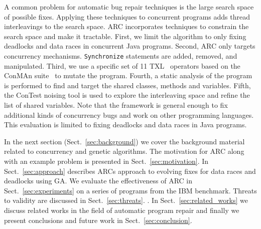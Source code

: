 A common problem for automatic bug repair techniques is the large search space of possible fixes. Applying these techniques to  concurrent programs adds thread interleavings to the search space. ARC incorporates techniques to constrain the search space and make it tractable. First, we limit the algorithm to only fixing deadlocks and data races in concurrent Java programs. Second, ARC only targets concurrency mechanisms. \texttt{Synchronize} statements are added, removed, and manipulated. Third, we use a specific set of 11 TXL~\cite{CHP91} operators based on the ConMAn suite~\cite{BCD06} to mutate the program.  Fourth, a static analysis of the program is performed to find and target the shared classes, methods and variables. Fifth, the ConTest noising tool is used to explore the interleaving space and refine the list of shared variables.  Note that the framework is general enough to fix additional kinds of concurrency bugs and work on other programming languages. This evaluation is limited to fixing deadlocks and data races in Java programs.

In the next section (Sect.~\ref{sec:background}) we cover the background material related to concurrency and genetic algorithms. The motivation for ARC along with an example problem is presented in Sect.~\ref{sec:motivation}. In Sect.~\ref{sec:approach} describes ARCs approach to evolving fixes for data races and deadlocks using GA\negC. We evaluate the effectiveness of ARC in Sect.~\ref{sec:experiments} on a series of programs from the IBM benchmark. Threats to validity are discussed in Sect.~\ref{sec:threats}. . In Sect.~\ref{sec:related_works} we discuss related works in the field of automatic program repair and finally we present conclusions and future work in Sect.~\ref{sec:conclusion}.



